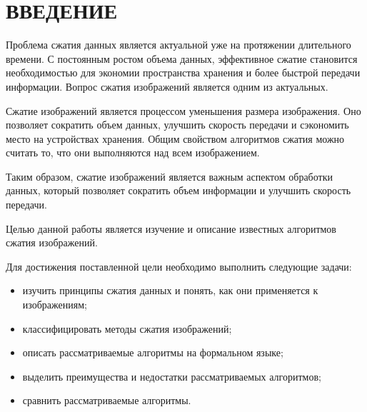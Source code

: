\chapter*{ВВЕДЕНИЕ}

Проблема сжатия данных является актуальной уже на протяжении длительного времени.
С постоянным ростом объема данных, эффективное сжатие становится необходимостью для экономии пространства хранения и более быстрой передачи информации.
Вопрос сжатия изображений является одним из актуальных.

Сжатие изображений является процессом уменьшения размера изображения.
Оно позволяет сократить объем данных, улучшить скорость передачи и сэкономить место на устройствах хранения.
Общим свойством алгоритмов сжатия можно считать то, что они выполняются над всем изображением.\cite{adaptive_method_image_compression}

Таким образом, сжатие изображений является важным аспектом обработки данных, который позволяет сократить объем информации и улучшить скорость передачи.

Целью данной работы является изучение и описание известных алгоритмов сжатия изображений.

Для достижения поставленной цели необходимо выполнить следующие задачи:
\begin{itemize}
    \item изучить принципы сжатия данных и понять, как они применяется к изображениям;
    \item классифицировать методы сжатия изображений;
    \item описать рассматриваемые алгоритмы на формальном языке;
    \item выделить преимущества и недостатки рассматриваемых алгоритмов;
    \item сравнить рассматриваемые алгоритмы.
\end{itemize}

